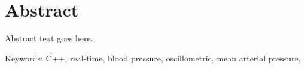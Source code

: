 \chapter{Abstract}

Abstract text goes here.


Keywords: C++, real-time, blood pressure, oscillometric, mean arterial pressure,  